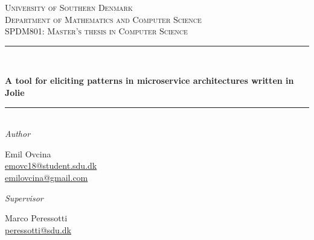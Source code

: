 \documentclass[oneside]{book}
\begin{document}
\begin{titlepage}

  \newcommand{\HRule}{\rule{\linewidth}{0.5mm}}

  \center %


  \textsc{\LARGE University of Southern Denmark}\\[1.5cm]

  \textsc{\Large Department of Mathematics and Computer Science}\\[0.5cm]

  \textsc{\large SPDM801: Master's thesis in Computer Science}\\[0.5cm]


  \HRule\\[0.5cm]

  \begin{spacing}{1.9}
    {\huge\bfseries A tool for eliciting patterns in microservice architectures written in Jolie}\\[0.0cm] %
  \end{spacing}

  \HRule\\[1.0cm]

  \large
  \textit{Author}\\ \bigskip
  \begin{minipage}[t]{0.45\textwidth}
    \begin{center}
      \normalsize
      Emil Ovcina\\
      \href{mailto:emovc18@student.sdu.dk}{emovc18@student.sdu.dk}\\
      \href{mailto:emilovcina@gmail.com}{emilovcina@gmail.com}\\ \bigskip
    \end{center}
  \end{minipage}
  \vfill\vfill\vfill
  \large
  \textit{Supervisor}\\ \bigskip
  \begin{minipage}[t]{0.45\textwidth}
    \begin{center}
      \normalsize
      Marco Peressotti\\
      \href{mailto:peressotti@sdu.dk}{peressotti@sdu.dk}\\ \bigskip
    \end{center}
  \end{minipage}



\end{titlepage}
\end{document}
